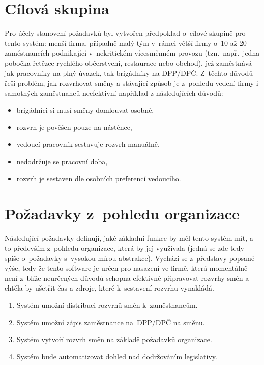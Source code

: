 \documentclass[twoside]{ctuthesis}
\begin{document}
\section{Cílová skupina}
Pro účely stanovení požadavků byl vytvořen předpoklad o~cílové skupině pro tento systém: menší firma, případně malý tým v~rámci větší firmy o~10 až 20 zaměstnancích podnikající v~nekritickém vícesměnném provozu (tzn.~např.~jedna pobočka řetězce rychlého občerstvení, restaurace nebo obchod), jež zaměstnává jak pracovníky na plný úvazek, tak brigádníky na DPP/DPČ. Z~těchto důvodů řeší problém, jak rozvrhovat směny a stávající způsob je z~pohledu vedení firmy i samotných zaměstnanců neefektivní například z následujících důvodů:
\begin{itemize}
	\item brigádníci si musí směny domlouvat osobně,
	\item rozvrh je pověšen pouze na nástěnce,
	\item vedoucí pracovník sestavuje rozvrh manuálně,
	\item nedodržuje se pracovní doba,
	\item rozvrh je sestaven dle osobních preferencí vedoucího.
\end{itemize}


\section{Požadavky z~pohledu organizace}

Následující požadavky definují, jaké základní funkce by měl tento systém mít, a to především z~pohledu organizace, která by jej využívala (jedná se zde tedy spíše o~požadavky s~vysokou mírou abstrakce). Vychází se z~představy popsané výše, tedy že tento software je určen pro nasazení ve firmě, která momentálně není z~blíže neurčených důvodů schopna efektivně připravovat rozvrhy směn a chtěla by ušetřit čas a zdroje, které k~sestavení rozvrhu vynakládá.

\begin{enumerate}[label=\textbf{F\arabic*.}]
	\item Systém umožní distribuci rozvrhů směn k~zaměstnancům.
	\item Systém umožní zápis zaměstnance na~DPP/DPČ na směnu.
	\item Systém vytvoří rozvrh směn na základě požadavků organizace.
	\item Systém bude automatizovat dohled nad dodržováním legislativy.
\end{enumerate}
\end{document}
